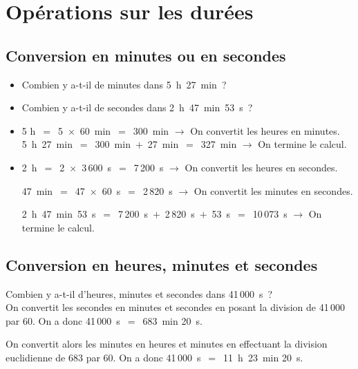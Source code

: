         
\section{Opérations sur les durées} 

\subsection{Conversion en minutes ou en secondes}

\begin{exemple*1}
\begin{itemize}
 \item Combien y a-t-il de minutes dans 5 h 27 min ?
 \item Combien y a-t-il de secondes dans 2 h 47 min 53 s ?
 \end{itemize}
\begin{itemize}
 \item 5 h $=$ 5 $\times$ 60 min $=$ 300 min $\longrightarrow$ On convertit les heures en minutes.
5 h 27 min $=$ 300 min $+$ 27 min $=$ 327 min $\longrightarrow$ On termine le calcul.
 \item 2 h $=$ 2 $\times$ 3\,600 s $=$ 7\,200 s $\longrightarrow$ On convertit les heures en secondes.
 
47 min $=$ 47 $\times$ 60 s $=$ 2\,820 s $\longrightarrow$ On convertit les minutes en secondes.

2 h 47 min 53 s $=$ 7\,200 s $+$ 2\,820 s $+$ 53 s $=$ 10\,073 s $\longrightarrow$ On termine le calcul.
 \end{itemize}
\end{exemple*1}

\subsection{Conversion en heures, minutes et secondes}

\begin{exemple*1}
Combien y a-t-il d'heures, minutes et secondes dans 41\,000 s ? \\[1em]
On convertit les secondes en minutes et secondes en posant la division de 41\,000 par 60.
On a donc 41\,000 s $=$ 683 min 20 s.
 
On convertit alors les minutes en heures et minutes en effectuant la division euclidienne de 683 par 60.
On a donc 41\,000 s $=$ 11 h 23 min 20 s.
\end{exemple*1}

